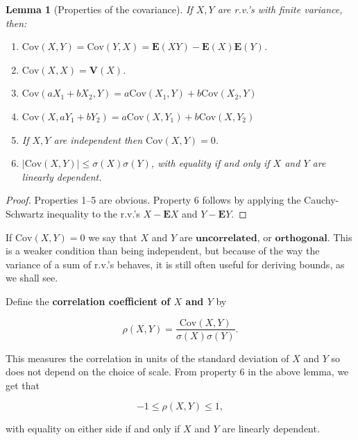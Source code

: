 \documentclass[11pt]{report}
\theoremstyle{plain}
\newtheorem{lem}[thm]{Lemma}
\theoremstyle{definition}
\begin{document}
\begin{lem}[Properties of the covariance]
If $X,Y$ are r.v.'s with finite variance, then:

\begin{enumerate}[label=\arabic*.]
\item $\textrm{Cov}(X,Y)=\textrm{Cov}(Y,X) = \mathbf{E}(XY)
- \mathbf{E}(X) \mathbf{E}(Y)$.

\item $\textrm{Cov}(X,X) = \mathbf{V}(X)$.

\item $\textrm{Cov}(aX_1+bX_2,Y) =
a\textrm{Cov}(X_1,Y)+b\textrm{Cov}(X_2,Y)$

\item $\textrm{Cov}(X,aY_1+bY_2) =
a\textrm{Cov}(X,Y_1)+b\textrm{Cov}(X,Y_2)$

\item If $X,Y$ are independent then $\textrm{Cov}(X,Y)=0$.

\item $|\textrm{Cov}(X,Y)| \le \sigma(X) \sigma(Y)$, with
equality if and only if $X$ and $Y$ are linearly
dependent.
\end{enumerate}

\end{lem}

\begin{proof}
Properties 1--5 are obvious. Property 6 follows by
applying the Cauchy-Schwartz inequality to the r.v.'s
$X-\mathbf{E} X$ and $Y-\mathbf{E} Y$.
\end{proof}

\noindent If $\textrm{Cov}(X,Y)=0$ we say that $X$ and $Y$ are
$\textbf{uncorrelated}$, or $\textbf{orthogonal}$.
This is a weaker condition than being independent, but
because of the way the variance of a sum of r.v.'s
behaves, it is still often useful for deriving bounds,
as we shall see.

Define the \textbf{correlation coefficient of $X$ and $Y$}
by

\[
\rho(X,Y) = \frac{\textrm{Cov}(X,Y)}{\sigma(X)\sigma(Y)}.
\]

\noindent This measures the correlation in units of the
standard deviation of $X$ and $Y$ so does not depend
on the choice of scale. From property 6 in the above
lemma, we get that

\[
-1\le \rho(X,Y)\le 1,
\]

\noindent with equality on either side if and only if $X$ and
$Y$ are linearly dependent.
\end{document}
